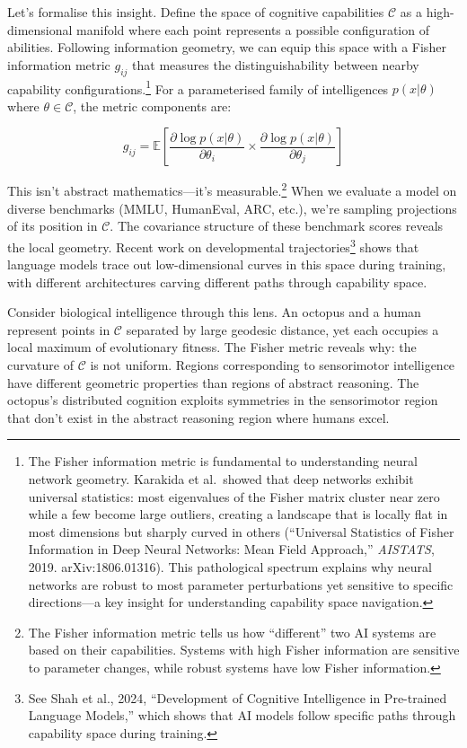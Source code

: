 \documentclass[acmsmall,screen]{acmart}
\begin{document}
Let's formalise this insight. Define the space of cognitive capabilities $\mathcal{C}$ as a high-dimensional manifold where each point represents a possible configuration of abilities. Following information geometry, we can equip this space with a Fisher information metric $g_{ij}$ that measures the distinguishability between nearby capability configurations.\footnote{The Fisher information metric is fundamental to understanding neural network geometry. Karakida et al.\ showed that deep networks exhibit universal statistics: most eigenvalues of the Fisher matrix cluster near zero while a few become large outliers, creating a landscape that is locally flat in most dimensions but sharply curved in others (``Universal Statistics of Fisher Information in Deep Neural Networks: Mean Field Approach,'' \textit{AISTATS}, 2019. arXiv:1806.01316). This pathological spectrum explains why neural networks are robust to most parameter perturbations yet sensitive to specific directions---a key insight for understanding capability space navigation.} For a parameterised family of intelligences $p(x|\theta)$ where $\theta \in \mathcal{C}$, the metric components are:

\begin{equation}
g_{ij} = \mathbb{E}\left[\frac{\partial \log p(x|\theta)}{\partial \theta_i} \times \frac{\partial \log p(x|\theta)}{\partial \theta_j}\right]
\end{equation}

This isn't abstract mathematics---it's measurable.\footnote{The Fisher information metric tells us how ``different'' two AI systems are based on their capabilities. Systems with high Fisher information are sensitive to parameter changes, while robust systems have low Fisher information.} When we evaluate a model on diverse benchmarks (MMLU, HumanEval, ARC, etc.), we're sampling projections of its position in $\mathcal{C}$. The covariance structure of these benchmark scores reveals the local geometry. Recent work on developmental trajectories\footnote{See Shah et al., 2024, ``Development of Cognitive Intelligence in Pre-trained Language Models,'' which shows that AI models follow specific paths through capability space during training.} shows that language models trace out low-dimensional curves in this space during training, with different architectures carving different paths through capability space.

Consider biological intelligence through this lens. An octopus and a human represent points in $\mathcal{C}$ separated by large geodesic distance, yet each occupies a local maximum of evolutionary fitness. The Fisher metric reveals why: the curvature of $\mathcal{C}$ is not uniform. Regions corresponding to sensorimotor intelligence have different geometric properties than regions of abstract reasoning. The octopus's distributed cognition exploits symmetries in the sensorimotor region that don't exist in the abstract reasoning region where humans excel.
\end{document}
